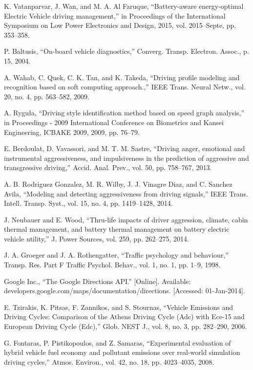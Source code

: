 K. Vatanparvar, J. Wan, and M. A. Al Faruque, ``Battery-aware energy-optimal Electric Vehicle driving management,'' in Proceedings of the International Symposium on Low Power Electronics and Design, 2015, vol. 2015–Septe, pp. 353–358.

P. Baltusis, ``On-board vehicle diagnostics,'' Converg. Transp. Electron. Assoc., p. 15, 2004.

A. Wahab, C. Quek, C. K. Tan, and K. Takeda, ``Driving profile modeling and recognition based on soft computing approach.,'' IEEE Trans. Neural Netw., vol. 20, no. 4, pp. 563–582, 2009.

A. Ryguła, ``Driving style identification method based on speed graph analysis,'' in Proceedings - 2009 International Conference on Biometrics and Kansei Engineering, ICBAKE 2009, 2009, pp. 76–79.

E. Berdoulat, D. Vavassori, and M. T. M. Sastre, ``Driving anger, emotional and instrumental aggressiveness, and impulsiveness in the prediction of aggressive and transgressive driving,'' Accid. Anal. Prev., vol. 50, pp. 758–767, 2013.

A. B. Rodriguez Gonzalez, M. R. Wilby, J. J. Vinagre Diaz, and C. Sanchez Avila, ``Modeling and detecting aggressiveness from driving signals,'' IEEE Trans. Intell. Transp. Syst., vol. 15, no. 4, pp. 1419–1428, 2014.

J. Neubauer and E. Wood, ``Thru-life impacts of driver aggression, climate, cabin thermal management, and battery thermal management on battery electric vehicle utility,'' J. Power Sources, vol. 259, pp. 262–275, 2014.

J. A. Groeger and J. A. Rothengatter, ``Traffic psychology and behaviour,'' Transp. Res. Part F Traffic Psychol. Behav., vol. 1, no. 1, pp. 1–9, 1998.

Google Inc., ``The Google Directions API.'' [Online]. Available: developers.google.com/maps/documentation/directions. [Accessed: 01-Jan-2014].

E. Tzirakis, K. Pitsas, F. Zannikos, and S. Stournas, ``Vehicle Emissions and Driving Cycles: Comparison of the Athens Driving Cycle (Adc) with Ece-15 and European Driving Cycle (Edc),'' Glob. NEST J., vol. 8, no. 3, pp. 282–290, 2006.

G. Fontaras, P. Pistikopoulos, and Z. Samaras, ``Experimental evaluation of hybrid vehicle fuel economy and pollutant emissions over real-world simulation driving cycles,'' Atmos. Environ., vol. 42, no. 18, pp. 4023–4035, 2008.


